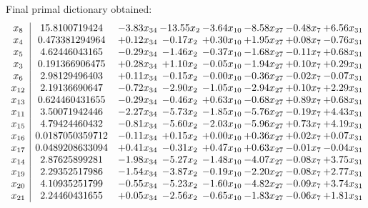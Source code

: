 \documentclass[8pt]{article}
\begin{document}
 Final primal dictionary obtained: 
\[\begin{array}{c| c c@{\hskip 2pt} c@{\hskip 2pt} c@{\hskip 2pt} c@{\hskip 2pt} c@{\hskip 2pt} c@{\hskip 2pt} }
 x_{8}   &  15.8100719424 & -3.83 x_{34} & -13.55 x_{2} & -3.64 x_{10} & -8.58 x_{27} & -0.48 x_{7} & +  6.56 x_{31}\\
 x_{4}   &  0.473381294964 & +  0.12 x_{34} & -0.17 x_{2} & +  0.30 x_{10} & +  1.95 x_{27} & +  0.08 x_{7} & -0.76 x_{31}\\
 x_{5}   &  4.62446043165 & -0.29 x_{34} & -1.46 x_{2} & -0.37 x_{10} & -1.68 x_{27} & -0.11 x_{7} & +  0.68 x_{31}\\
 x_{3}   &  0.191366906475 & +  0.28 x_{34} & +  1.10 x_{2} & -0.05 x_{10} & -1.94 x_{27} & +  0.10 x_{7} & +  0.29 x_{31}\\
 x_{6}   &  2.98129496403 & +  0.11 x_{34} & -0.15 x_{2} & -0.00 x_{10} & -0.36 x_{27} & -0.02 x_{7} & -0.07 x_{31}\\
 x_{12}   &  2.19136690647 & -0.72 x_{34} & -2.90 x_{2} & -1.05 x_{10} & -2.94 x_{27} & +  0.10 x_{7} & +  2.29 x_{31}\\
 x_{13}   &  0.624460431655 & -0.29 x_{34} & -0.46 x_{2} & +  0.63 x_{10} & -0.68 x_{27} & +  0.89 x_{7} & +  0.68 x_{31}\\
 x_{11}   &  3.50071942446 & -2.27 x_{34} & -5.73 x_{2} & -1.85 x_{10} & -5.76 x_{27} & -0.19 x_{7} & +  4.43 x_{31}\\
 x_{15}   &  4.79424460432 & -0.81 x_{34} & -5.60 x_{2} & -2.03 x_{10} & -5.96 x_{27} & +  0.73 x_{7} & +  4.19 x_{31}\\
 x_{16}   &  0.0187050359712 & -0.11 x_{34} & +  0.15 x_{2} & +  0.00 x_{10} & +  0.36 x_{27} & +  0.02 x_{7} & +  0.07 x_{31}\\
 x_{17}   &  0.0489208633094 & +  0.41 x_{34} & -0.31 x_{2} & +  0.47 x_{10} & +  0.63 x_{27} & -0.01 x_{7} & -0.04 x_{31}\\
 x_{14}   &  2.87625899281 & -1.98 x_{34} & -5.27 x_{2} & -1.48 x_{10} & -4.07 x_{27} & -0.08 x_{7} & +  3.75 x_{31}\\
 x_{19}   &  2.29352517986 & -1.54 x_{34} & -3.87 x_{2} & -0.19 x_{10} & -2.20 x_{27} & -0.08 x_{7} & +  2.77 x_{31}\\
 x_{20}   &  4.10935251799 & -0.55 x_{34} & -5.23 x_{2} & -1.60 x_{10} & -4.82 x_{27} & -0.09 x_{7} & +  3.74 x_{31}\\
 x_{21}   &  2.24460431655 & +  0.05 x_{34} & -2.56 x_{2} & -0.65 x_{10} & -1.83 x_{27} & -0.06 x_{7} & +  1.81 x_{31}\\

\end{array}\]
\end{document}

